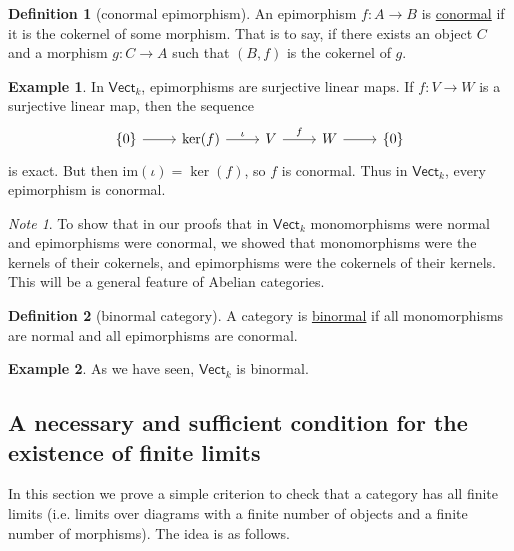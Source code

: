 \documentclass[a4paper]{report}
\newcommand{\defn}[1]{\ul{#1}}
\theoremstyle{definition}
\newtheorem{definition}{Definition}[section]
\newtheorem{example}{Example}[section]
\theoremstyle{plain}
\theoremstyle{remark}
\newtheorem{note}{Note}[section]
\begin{document}
\begin{definition}[conormal epimorphism]
  \label{def:conormalepimorphism}
  An epimorphism $f\colon A \to B$ is \defn{conormal} if it is the cokernel of some morphism. That is to say, if there exists an object $C$ and a morphism $g\colon C \to A$ such that $(B, f)$ is the cokernel of $g$.
\end{definition}

\begin{example}
  In $\mathsf{Vect}_{k}$, epimorphisms are surjective linear maps. If $f\colon V \to W$ is a surjective linear map, then the sequence
  \begin{equation*}
    \begin{tikzcd}
      \{0\} \arrow[r] & \ker(f) \arrow[r, "\iota"] & V \arrow[r, "f"] & W \arrow[r] & \{0\}
    \end{tikzcd}
  \end{equation*}
  is exact. But then $\mathrm{im}(\iota) = \ker(f)$, so $f$ is conormal. Thus in $\mathsf{Vect}_{k}$, every epimorphism is conormal.
\end{example}

\begin{note}
  To show that in our proofs that in $\mathsf{Vect}_{k}$ monomorphisms were normal and epimorphisms were conormal, we showed that monomorphisms were the kernels of their cokernels, and epimorphisms were the cokernels of their kernels. This will be a general feature of Abelian categories.
\end{note}

\begin{definition}[binormal category]
  \label{def:binormalcategory}
  A category is \defn{binormal} if all monomorphisms are normal and all epimorphisms are conormal.
\end{definition}

\begin{example}
  As we have seen, $\mathsf{Vect}_{k}$ is binormal.
\end{example}

\subsection{A necessary and sufficient condition for the existence of finite limits}
In this section we prove a simple criterion to check that a category has all finite limits (i.e. limits over diagrams with a finite number of objects and a finite number of morphisms). The idea is as follows.
\end{document}
